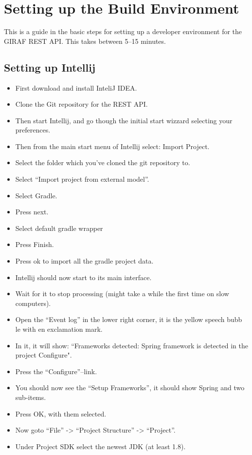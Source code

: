 \section{Setting up the Build Environment}
This is a guide in the basic steps for setting up a developer environment for the GIRAF REST API.
This takes between 5--15 minutes.
\subsection*{Setting up Intellij}
\begin{itemize}
    \item First download and install InteliJ IDEA.
    \item Clone the Git repository for the REST API.
    \item Then start Intellij, and go though the initial start wizzard selecting your preferences.
    \item Then from the main start menu of Intellij select: Import Project.
    \item Select the folder which you've cloned the git repository to.
    \item Select ``Import project from external model''.
    \item Select Gradle.
    \item Press next.
    \item Select default gradle wrapper
    \item Press Finish.
    \item Press ok to import all the gradle project data.
    \item Intellij should now start to its main interface.
    \item Wait for it to stop processing (might take a while the first time on slow computers).
    \item Open the ``Event log'' in the lower right corner, it is the yellow speech bubb
le with en exclamation mark.
    \item In it, it will show: ``Frameworks detected: Spring framework is detected in the project Configure".
    \item Press the ``Configure''--link.
    \item You should now see the ``Setup Frameworks'', it should show Spring and two sub-items.
    \item Press OK, with them selected.
    \item Now goto ``File'' -> ``Project Structure'' -> ``Project''.
    \item Under Project SDK select the newest JDK (at least 1.8).

\end{itemize}
